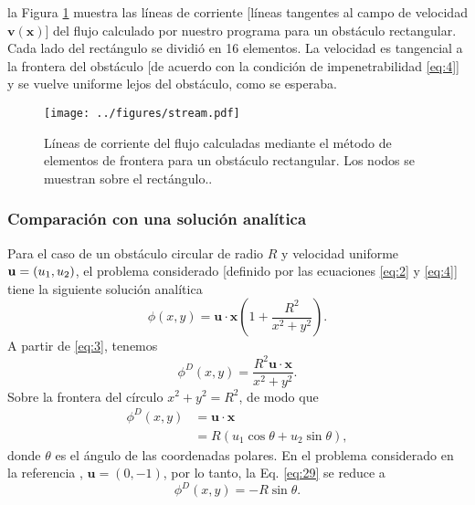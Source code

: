 \documentclass[11pt]{article}
\begin{document}
la Figura \ref{fig:stream} muestra las líneas de corriente [líneas tangentes al campo de velocidad $\mathbf{v}(\mathbf{x})$] del flujo calculado por nuestro programa para un obstáculo rectangular. Cada lado del rectángulo se dividió en 16 elementos. La velocidad es tangencial a la frontera del obstáculo [de acuerdo con la condición de impenetrabilidad \eqref{eq:4}] y se vuelve uniforme lejos del obstáculo, como se esperaba.

\begin{figure}[h]
  \centering
      \texttt{[image: ../figures/stream.pdf]}
  \caption{Líneas de corriente del flujo calculadas mediante el método de elementos de frontera para un obstáculo rectangular. Los nodos se muestran sobre el rectángulo..}
  \label{fig:stream}
\end{figure}

\subsubsection{Comparación con una solución analítica}
Para el caso de un obstáculo circular de radio $R$ y velocidad uniforme ${\bf u}=(u_1, u_2)$, el problema considerado [definido por las ecuaciones \eqref{eq:2} y \eqref{eq:4}] tiene la siguiente solución analítica
\begin{equation}
  \label{eq:27}
  \phi(x,y) = \mathbf{u}\cdot\mathbf{x}\left(1 + \frac{R^2}{x^2+y^2}\right).
\end{equation}
A partir de \eqref{eq:3}, tenemos
  \begin{equation}
    \label{eq:28}
    \phi^D(x,y) = \frac{R^2\mathbf{u}\cdot\mathbf{x}}{x^2 + y^2}.
  \end{equation}
  Sobre la frontera del círculo $x^2 + y^2 = R^2$, de modo que
  \begin{align}
    \phi^D(x,y) &= \mathbf{u}\cdot\mathbf{x} \\
              &= R(u_1\cos\theta + u_2\sin\theta),    \label{eq:29}
  \end{align}
 donde $\theta$ es el ángulo de las coordenadas polares. En el problema considerado en la referencia \cite{zhevandrov2025discrete}, $\mathbf{u} = (0, -1)$, por lo tanto, la Eq. \eqref{eq:29} se reduce a
  \begin{equation}
    \label{eq:31}
    \phi^D(x,y) = -R\sin\theta.
  \end{equation}
\end{document}
